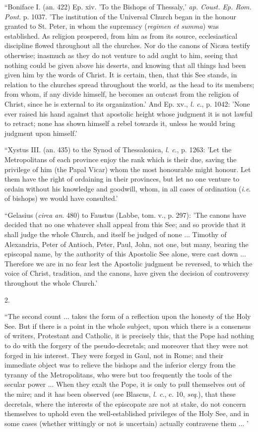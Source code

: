 ``Boniface I. (an. 422) Ep. xiv. 'To the Bishops
of Thessaly,' \emph{ap. Coust. Ep. Rom. Pont}. p. 1037. 'The
institution of the Universal Church began in the honour granted to St.
Peter, in whom the supremacy (\emph{regimen et summa}) was
established. As religion prospered, from him as from its source,
ecclesiastical discipline flowed throughout all the churches. Nor do
the canons of Nicæa testify otherwise; inasmuch as they do not
venture to add aught to him, seeing that nothing could be given above
his deserts, and knowing that all things had been given him by the
words of Christ. It is certain, then, that this See stands, in
relation to the churches spread throughout the world, as the head to
its members; from whom, if any divide himself, he becomes an outcast
from the religion of Christ, since he is external to its
organization.' And Ep. xv., \emph{l. c}., p. 1042: 'None ever raised
his hand against that apostolic height whose judgment it is not lawful
to retract; none has shown himself a rebel towards it, unless he would
bring judgment upon himself.'

``Xystus III. (an. 435) to the Synod of
Thessalonica, \emph{l. c}., p. 1263: 'Let the Metropolitans of each
province enjoy the rank which is their due, saving the privilege of
him (the Papal Vicar) whom the most honourable might honour. Let them
have the right of ordaining in their provinces, but let no one venture
to ordain without his knowledge and goodwill, whom, in all cases of
ordination (\emph{i.e}. of bishops) we would have consulted.'

``Gelasius (\emph{circa an}. 480) to Faustus (Labbe,
tom. v., p. 297): 'The canons have decided that no one whatever shall
appeal from this See; and so provide that it shall judge the whole
Church, and itself be judged of none ... Timothy of Alexandria, Peter
of Antioch, Peter, Paul, John, not one, but many, bearing the
episcopal name, by the authority of this Apostolic See alone, were
cast down ... Therefore we are in no fear lest the Apostolic judgment
be reversed, to which the voice of Christ, tradition, and the canons,
have given the decision of controversy throughout the whole Church.'

2.

``The second count ... takes the form of a
reflection upon the honesty of the Holy See. But if there is a point
in the whole subject, upon which there is a consensus of writers,
Protestant and Catholic, it is precisely this, that the Pope had
nothing to do with the forgery of the pseudo-decretals; and moreover
that they were not forged in his interest. They were forged in Gaul,
not in Rome; and their immediate object was to relieve the bishops and
the inferior clergy from the tyranny of the Metropolitans, who were
but too frequently the tools of the secular power ... When they exalt
the Pope, it is only to pull themselves out of the mire; and it has
been observed (see Blascus, \emph{l. c}., c. 10, \emph{seq}.), that
these decretals, where the interests of the episcopate are not at
stake, do not concern themselves to uphold even the well-established
privileges of the Holy See, and in some cases (whether wittingly or
not is uncertain) actually contravene them
... '

